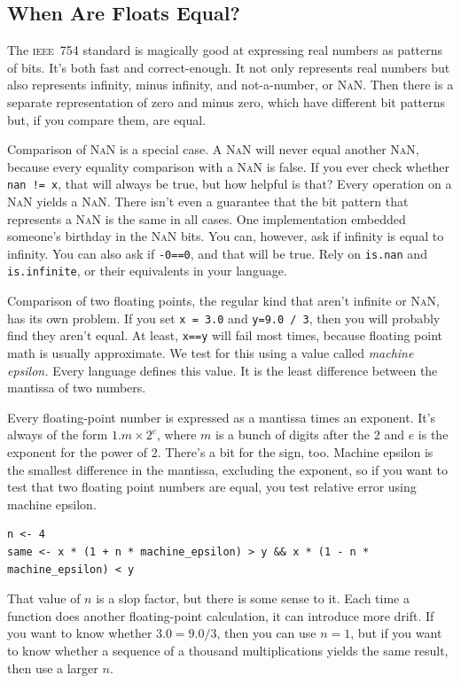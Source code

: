 \documentclass[fleqn,10pt]{olplainarticle}
\newcommand{\nan}{\textsc{NaN}\xspace}
\newcommand{\ieee}{\textsc{ieee}\xspace}
\begin{document}
\subsection{When Are Floats Equal?}
The \ieee~754 standard is magically good at expressing real numbers as
patterns of bits. It's both fast and correct-enough. It not only represents
real numbers but also represents infinity, minus infinity, and
not-a-number, or \nan. Then there is a separate representation of
zero and minus zero, which have different bit patterns but, if you compare
them, are equal.

Comparison of \nan is a special case.
A \nan will never equal another \nan, because every equality comparison with
a \nan is false. If you ever check whether \lstinline|nan != x|, that will
always be true, but how helpful is that?
Every operation
on a \nan yields a \nan. There isn't even a guarantee that the bit
pattern that represents a \nan is the same in all cases.
One implementation embedded someone's birthday in the \nan bits.
You can, however, ask if infinity
is equal to infinity. You can also ask if
\lstinline!-0==0!, and that will be true. Rely on \lstinline!is.nan! and
\lstinline!is.infinite!, or their equivalents in your language.

Comparison of two floating points, the regular kind that aren't
infinite or \nan, has its own problem. If you set
\lstinline!x = 3.0! and \lstinline!y=9.0 / 3!, then you will probably find they
aren't equal. At least, \lstinline!x==y! will fail most times, because
floating point math is usually approximate. We test for this
using a value called \emph{machine epsilon.} Every language defines
this value. It is the least difference between the
mantissa of two numbers.

Every floating-point number is expressed as a mantissa times
an exponent. It's always of the form $1.m \times 2^e$, where
$m$ is a bunch of digits after the 2 and $e$ is the exponent
for the power of 2. There's a bit for the sign, too.
Machine epsilon is the smallest difference in the mantissa,
excluding the exponent, so if you want to test that two
floating point numbers are equal, you test relative error using
machine epsilon.
\begin{lstlisting}
n <- 4
same <- x * (1 + n * machine_epsilon) > y && x * (1 - n * machine_epsilon) < y
\end{lstlisting}
That value of $n$ is a slop factor, but there is some sense
to it. Each time a function does another floating-point calculation,
it can introduce more drift. If you want to know whether
$3.0 = 9.0 / 3$, then you can use $n=1$, but if you want to know
whether a sequence of a thousand multiplications yields the
same result, then use a larger $n$.
\end{document}
